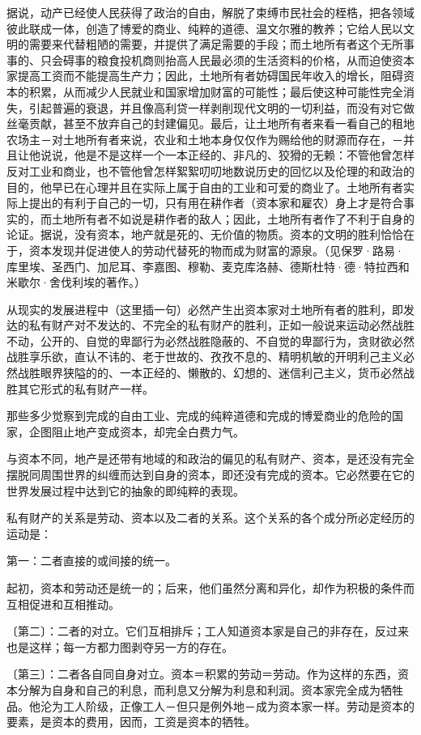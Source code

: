 \documentclass[a4paper,twoside,12pt]{ctexart}
\begin{document}
据说，动产已经使人民获得了政治的自由，解脱了束缚市民社会的桎梏，把各领域彼此联成一体，创造了博爱的商业、纯粹的道德、温文尔雅的教养；它给人民以文明的需要来代替粗陋的需要，并提供了满足需要的手段；而土地所有者这个无所事事的、只会碍事的粮食投机商则抬高人民最必须的生活资料的价格，从而迫使资本家提高工资而不能提高生产力；因此，土地所有者妨碍国民年收入的增长，阻碍资本的积累，从而减少人民就业和国家增加财富的可能性；最后使这种可能性完全消失，引起普遍的衰退，并且像高利贷一样剥削现代文明的一切利益，而没有对它做丝毫贡献，甚至不放弃自己的封建偏见。最后，让土地所有者来看一看自己的租地农场主－对土地所有者来说，农业和土地本身仅仅作为赐给他的财源而存在，－并且让他说说，他是不是这样一个一本正经的、非凡的、狡猾的无赖：不管他曾怎样反对工业和商业，也不管他曾怎样絮絮叨叨地数说历史的回忆以及伦理的和政治的目的，他早已在心理并且在实际上属于自由的工业和可爱的商业了。土地所有者实际上提出的有利于自己的一切，只有用在耕作者（资本家和雇农）身上才是符合事实的，而土地所有者不如说是耕作者的敌人；因此，土地所有者作了不利于自身的论证。据说，没有资本，地产就是死的、无价值的物质。资本的文明的胜利恰恰在于，资本发现并促进使人的劳动代替死的物而成为财富的源泉。（见保罗·路易·库里埃、圣西门、加尼耳、李嘉图、穆勒、麦克库洛赫、德斯杜特·德·特拉西和米歇尔·舍伐利埃的著作。）

从现实的发展进程中（这里插一句）必然产生出资本家对土地所有者的胜利，即发达的私有财产对不发达的、不完全的私有财产的胜利，正如一般说来运动必然战胜不动，公开的、自觉的卑鄙行为必然战胜隐蔽的、不自觉的卑鄙行为，贪财欲必然战胜享乐欲，直认不讳的、老于世故的、孜孜不息的、精明机敏的开明利己主义必然战胜眼界狭隘的的、一本正经的、懒散的、幻想的、迷信利己主义，货币必然战胜其它形式的私有财产一样。

那些多少觉察到完成的自由工业、完成的纯粹道德和完成的博爱商业的危险的国家，企图阻止地产变成资本，却完全白费力气。

与资本不同，地产是还带有地域的和政治的偏见的私有财产、资本，是还没有完全摆脱同周围世界的纠缠而达到自身的资本，即还没有完成的资本。它必然要在它的世界发展过程中达到它的抽象的即纯粹的表现。

私有财产的关系是劳动、资本以及二者的关系。这个关系的各个成分所必定经历的运动是：

第一：二者直接的或间接的统一。

起初，资本和劳动还是统一的；后来，他们虽然分离和异化，却作为积极的条件而互相促进和互相推动。

〔第二〕：二者的对立。它们互相排斥；工人知道资本家是自己的非存在，反过来也是这样；每一方都力图剥夺另一方的存在。

〔第三〕：二者各自同自身对立。资本＝积累的劳动＝劳动。作为这样的东西，资本分解为自身和自己的利息，而利息又分解为利息和利润。资本家完全成为牺牲品。他沦为工人阶级，正像工人－但只是例外地－成为资本家一样。劳动是资本的要素，是资本的费用，因而，工资是资本的牺牲。
\end{document}

